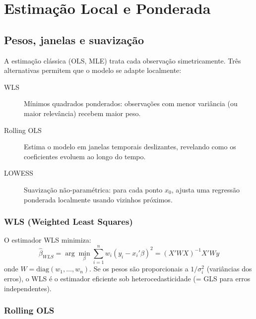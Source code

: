 \chapter{Estimação Local e Ponderada}
\label{cap:local}

\section{Pesos, janelas e suavização}

A estimação clássica (OLS, MLE) trata cada observação simetricamente.
Três alternativas permitem que o modelo se adapte localmente:

\begin{description}
  \item[WLS] Mínimos quadrados ponderados: observações com menor variância
    (ou maior relevância) recebem maior peso.

  \item[Rolling OLS] Estima o modelo em janelas temporais deslizantes,
    revelando como os coeficientes evoluem ao longo do tempo.

  \item[LOWESS] Suavização não-paramétrica: para cada ponto $x_0$, ajusta
    uma regressão ponderada localmente usando vizinhos próximos.
\end{description}

\subsection*{WLS (Weighted Least Squares)}

O estimador WLS minimiza:
\[
  \hat{\beta}_{WLS} = \arg\min_\beta \sum_{i=1}^n w_i (y_i - x_i'\beta)^2
  = (X'WX)^{-1} X'Wy
\]
onde $W = \text{diag}(w_1, \ldots, w_n)$. Se os pesos são proporcionais a
$1/\sigma_i^2$ (variâncias dos erros), o WLS é o estimador eficiente sob
heterocedasticidade (= GLS para erros independentes).

\subsection*{Rolling OLS}


